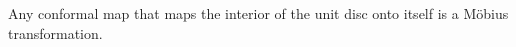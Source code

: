 \documentclass[12pt]{article}
\begin{document}
Any conformal map that maps the interior of the unit disc onto itself is a M\"obius transformation.
\end{document}
